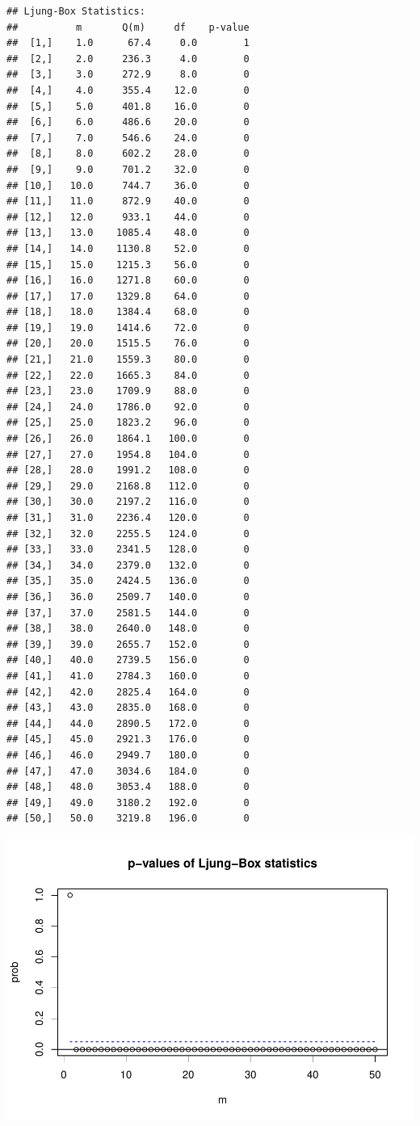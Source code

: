 \documentclass[12pt,a4paper]{article}
\begin{document}
\begin{verbatim}
## Ljung-Box Statistics:  
##          m       Q(m)     df    p-value
##  [1,]    1.0      67.4     0.0        1
##  [2,]    2.0     236.3     4.0        0
##  [3,]    3.0     272.9     8.0        0
##  [4,]    4.0     355.4    12.0        0
##  [5,]    5.0     401.8    16.0        0
##  [6,]    6.0     486.6    20.0        0
##  [7,]    7.0     546.6    24.0        0
##  [8,]    8.0     602.2    28.0        0
##  [9,]    9.0     701.2    32.0        0
## [10,]   10.0     744.7    36.0        0
## [11,]   11.0     872.9    40.0        0
## [12,]   12.0     933.1    44.0        0
## [13,]   13.0    1085.4    48.0        0
## [14,]   14.0    1130.8    52.0        0
## [15,]   15.0    1215.3    56.0        0
## [16,]   16.0    1271.8    60.0        0
## [17,]   17.0    1329.8    64.0        0
## [18,]   18.0    1384.4    68.0        0
## [19,]   19.0    1414.6    72.0        0
## [20,]   20.0    1515.5    76.0        0
## [21,]   21.0    1559.3    80.0        0
## [22,]   22.0    1665.3    84.0        0
## [23,]   23.0    1709.9    88.0        0
## [24,]   24.0    1786.0    92.0        0
## [25,]   25.0    1823.2    96.0        0
## [26,]   26.0    1864.1   100.0        0
## [27,]   27.0    1954.8   104.0        0
## [28,]   28.0    1991.2   108.0        0
## [29,]   29.0    2168.8   112.0        0
## [30,]   30.0    2197.2   116.0        0
## [31,]   31.0    2236.4   120.0        0
## [32,]   32.0    2255.5   124.0        0
## [33,]   33.0    2341.5   128.0        0
## [34,]   34.0    2379.0   132.0        0
## [35,]   35.0    2424.5   136.0        0
## [36,]   36.0    2509.7   140.0        0
## [37,]   37.0    2581.5   144.0        0
## [38,]   38.0    2640.0   148.0        0
## [39,]   39.0    2655.7   152.0        0
## [40,]   40.0    2739.5   156.0        0
## [41,]   41.0    2784.3   160.0        0
## [42,]   42.0    2825.4   164.0        0
## [43,]   43.0    2835.0   168.0        0
## [44,]   44.0    2890.5   172.0        0
## [45,]   45.0    2921.3   176.0        0
## [46,]   46.0    2949.7   180.0        0
## [47,]   47.0    3034.6   184.0        0
## [48,]   48.0    3053.4   188.0        0
## [49,]   49.0    3180.2   192.0        0
## [50,]   50.0    3219.8   196.0        0
\end{verbatim}

\includegraphics{solution_exercise_5_files/figure-latex/unnamed-chunk-23-1.pdf}
\end{document}
